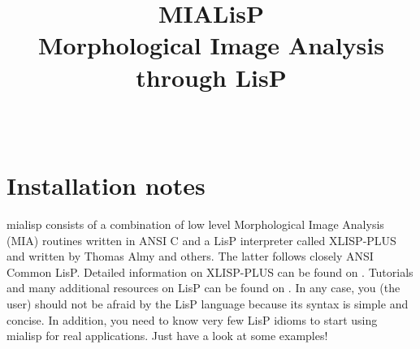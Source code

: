 \documentclass{book}
\begin{document}

\title{MIALisP\\Morphological Image Analysis through LisP}
\author{\\
}


\setcounter{tocdepth}{2}


\maketitle


\cleardoublepage
{}
\tableofcontents

\newpage
{}

\chapter{Installation notes}
mialisp consists of a combination of low level Morphological Image Analysis (MIA) routines written in ANSI C and a LisP interpreter called XLISP-PLUS and written by Thomas Almy and others.  The latter follows closely ANSI Common LisP.  Detailed information on XLISP-PLUS can be found on .  Tutorials and many additional resources on LisP can be found on .  In any case, you (the user) should not be afraid by the LisP language because its syntax is simple and concise.  In addition, you need to know very few LisP idioms to start using mialisp for real applications.  Just have a look at some examples!
\end{document}
